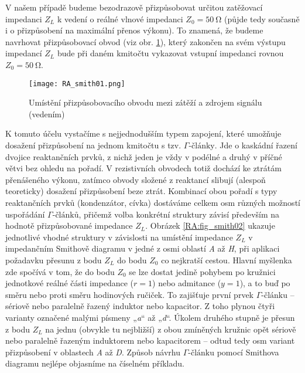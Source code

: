         V našem případě budeme bezodrazově přizpůsobovat určitou zatěžovací impedanci \(Z_L\) k 
        vedení o reálné vlnové impedanci \(Z_0 = \SI{50}{\ohm}\) (půjde tedy současně i o 
        přizpůsobení na maximální přenos výkonu). To znamená, že budeme navrhovat přizpůsobovací 
        obvod (viz obr. \ref{fyz:fig_RA_smith01}), který zakončen na svém  výstupu impedancí 
        \(Z_L\) bude při daném kmitočtu vykazovat vstupní impedanci rovnou \(Z_0 = \SI{50}{\ohm}\).
        \begin{figure}[ht!] %
          \centering
          \texttt{[image: RA\_smith01.png]}
          \caption{Umístění přizpůsobovacího obvodu mezi zátěží a zdrojem signálu (vedením)}
          \label{fyz:fig_RA_smith01} 
        \end{figure}
        K tomuto účelu vystačíme s nejjednodušším typem zapojení, které umožňuje dosažení 
        přizpůsobení na jednom kmitočtu s tzv. \(\Gamma\text{-články}\). Jde o kaskádní řazení 
        dvojice reaktančních prvků, z nichž jeden je vždy v podélné a druhý v příčné větvi bez 
        ohledu na pořadí. V rezistivních obvodech totiž dochází ke ztrátám přenášeného výkonu, 
        zatímco obvody složené z reaktancí slibují (alespoň teoreticky) dosažení přizpůsobení beze 
        ztrát. Kombinací obou pořadí s typy reaktančních prvků (kondenzátor, cívka) dostáváme 
        celkem osm různých možností uspořádání \(\Gamma\text{-článků}\), přičemž volba konkrétní 
        struktury závisí především na hodnotě přizpůsobované impedance \(Z_L\). Obrázek 
        \ref{RA:fig_smith02}  ukazuje jednotlivé vhodné struktury v závislosti na umístění 
        impedance \(Z_L\) v impedančním Smithově diagramu v jedné z osmi oblastí \emph{A} až 
        \emph{H}, při aplikaci požadavku přesunu z bodu \(Z_L\) do bodu \(Z_0\) co nejkratší 
        cestou. Hlavní myšlenka zde spočívá v tom, že do bodu \(Z_0\) se lze dostat jedině pohybem 
        po kružnici jednotkové reálné části impedance (\(r = 1\)) nebo admitance (\(y = 1\)), a to 
        buď po směru nebo proti směru hodinových ručiček. To zajišťuje první prvek 
        \(\Gamma\text{-článku}\) – sériově nebo paralelně řazený induktor nebo kapacitor. Z toho 
        plynou čtyři varianty označené malými písmeny „\emph{a}“ až „\emph{d}“. Úkolem 
        druhého stupně je přesun z bodu \(Z_L\) na jednu (obvykle tu nejbližší) z obou zmíněných 
        kružnic opět sériově nebo paralelně řazeným induktorem nebo kapacitorem – odtud tedy osm 
        variant přizpůsobení v oblastech \emph{A} až \emph{D}. Způsob návrhu 
        \(\Gamma\text{-článku}\) pomocí Smithova diagramu nejlépe objasníme na číselném příkladu.
  
